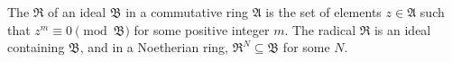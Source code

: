 The  $\mathfrak{R}$ of an ideal $\mathfrak{B}$ in a commutative ring $\mathfrak{A}$ is the set of elements $z \in \mathfrak{A}$ such that $z^m \equiv 0 \pmod{\mathfrak{B}}$ for some positive integer $m$. The radical $\mathfrak{R}$ is an ideal containing $\mathfrak{B}$, and in a Noetherian ring, $\mathfrak{R}^N \subseteq \mathfrak{B}$ for some $N$.

